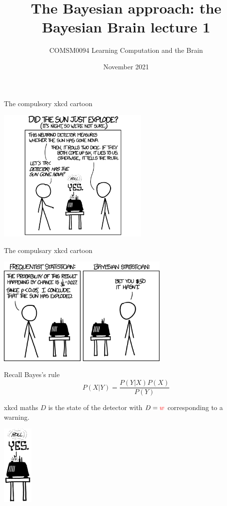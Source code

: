 \documentclass{beamer}
\title[The Bayesian Brain lecture 1]{The Bayesian approach: the Bayesian Brain lecture 1}
\author{COMSM0094 Learning Computation and the Brain}
\institute{\texttt{comsm0075.github.io}}
\date{November 2021}
\newcommand{\crish}{\color{reddish}}
\newcommand{\cbla}{\color{black}}
\newcommand{\cred}{\color{red}}
\begin{document}
\maketitle

\begin{frame}{The compulsory xkcd cartoon}
\begin{center}
\includegraphics[width=7.5cm]{xkcd1.png}
\end{center}
\vfill
{}
\end{frame}


\begin{frame}{The compulsary xkcd cartoon}
\begin{center}
\includegraphics[width=8.5cm]{xkcd2.png}
\end{center}
\vfill
{}
\end{frame}

\begin{frame}{Recall Bayes's rule}
  \crish$$
  P(X|Y)=\frac{P(Y|X)P(X)}{P(Y)}
  $$\cbla
\end{frame}

\begin{frame}{xkcd maths}
  \crish$D$\cbla{} is the state of the detector with
  \crish$D=\cred{}w$\cbla{} corresponding to a \cred{}warning\cbla{}.
\begin{center}
\includegraphics[width=1.5cm]{xkcd_detector.png}
\end{center}
\end{frame}
\end{document}
